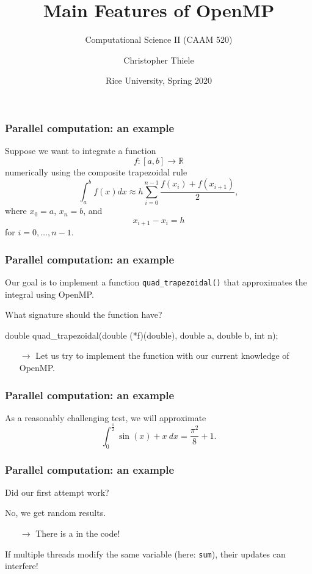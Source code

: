 \documentclass[12pt,t]{beamer}
\let\emph\relax %
\newcommand{\conclude}[1]{%
  \begin{itemize}
    \item[$\rightarrow$]#1
  \end{itemize}
}
\begin{document}
  \title{Main Features of OpenMP}
  \subtitle{Computational Science II (CAAM 520)}
  \author{Christopher Thiele}
  \date{Rice University, Spring 2020}

  \begin{frame}
    \titlepage
  \end{frame}


  \begin{frame}[fragile]
    \frametitle{Parallel computation: an example}

    Suppose we want to integrate a function
    \[f:\left[a,b\right]\rightarrow\mathbb R\]
    numerically using the composite trapezoidal rule
    \[\int_a^b f(x)dx\approx h\sum_{i=0}^{n-1}\frac{f(x_i)+f(x_{i+1})}2,\]
    where $x_0=a$, $x_n=b$, and
    \[x_{i+1}-x_i=h\]
    for $i=0,\ldots,n-1$.
  \end{frame}

  \begin{frame}[fragile]
    \frametitle{Parallel computation: an example}

    Our goal is to implement a function \texttt{quad\_trapezoidal()} that approximates the integral \emph{in parallel} using OpenMP.

    What signature should the function have?
    \pause
    \begin{code}
double quad_trapezoidal(double (*f)(double),
                        double a,
                        double b,
                        int n);
    \end{code}
    \conclude{Let us try to implement the function with our current knowledge of OpenMP.}
  \end{frame}

  \begin{frame}[fragile]
    \frametitle{Parallel computation: an example}

    As a reasonably challenging test, we will approximate
    \[\int_0^{\frac{\pi}2}\sin(x)+x\ dx=\frac{\pi^2}8+1.\]
  \end{frame}

  \begin{frame}[fragile]
    \frametitle{Parallel computation: an example}

    Did our first attempt work?

    No, we get random results.
    \conclude{There is a \emph{data race} in the code!}

    If multiple threads modify the same variable (here: \texttt{sum}), their updates can interfere!
  \end{frame}
\end{document}
